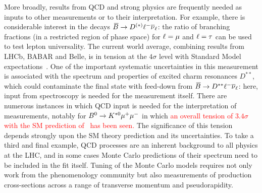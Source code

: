 More broadly, results from QCD and strong physics are frequently
needed as inputs to other measurements or to their interpretation.
For example, there is considerable interest in the decays
${\kern 0.18em\overline{\kern -0.18em B}{}} \rightarrow D^{(*)} {\ell}^- {{\overline{\nu}}_\ell}$: the ratio of branching fractions
(in a restricted region of phase space) for ${\ell}={\mu}$ and ${\ell}={\tau}$
can be used to test lepton universality. The current world average,
combining results from LHCb, BABAR and Belle, is in tension
at the $4\sigma$ level with Standard Model expectations~\cite{bib:hfag}.
One of the important systematic uncertainties in this measurement
is associated with the spectrum and properties of excited charm resonances $D^{**}$,
which could contaminate the final state with feed-down from
${\kern 0.18em\overline{\kern -0.18em B}{}} \rightarrow D^{**} {\ell}^- {{\overline{\nu}}_\ell}$: here, input from spectroscopy is
needed for the measurement itself. There are numerous instances
in which QCD input is needed for the interpretation of measurements,
notably for ${{B}^0} \rightarrow {\ensuremath{{K}^{*0}}} {\ensuremath{\mu^+}} {\ensuremath{\mu^-}}$ in which 
\textcolor{red}{an overall tension of $3.4\sigma$ with the SM prediction of~\cite{Descotes-Genon:2014uoa} has been seen.}  
The significance of this 
tension depends strongly upon the SM theory prediction and its
uncertainties. To take a third and final example, QCD processes are
an inherent background to all physics at the LHC, and in some cases
Monte Carlo predictions of their spectrum need to be included in the
fit itself. Tuning of the Monte Carlo models requires not only work
from the phenomenology community but also measurements of production
cross-sections across a range of transverse momentum and
pseudorapidity.



